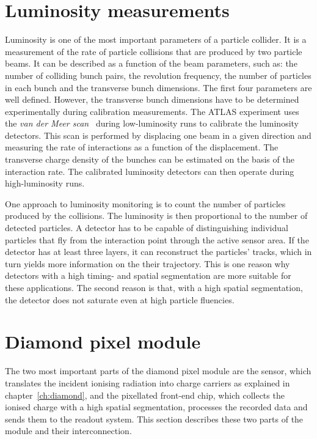 \section{Luminosity measurements}
\label{sec:lummeas}
 \label{sec:lumi}
Luminosity is one of the most important parameters of a particle collider. It is a measurement of the rate of particle collisions that are produced by two particle beams. It can be described as a function of the beam parameters, such as: the number of colliding bunch pairs, the revolution frequency, the number of particles in each bunch and the transverse bunch dimensions. The first four parameters are well defined. However, the transverse bunch dimensions have to be determined experimentally during calibration measurements. The ATLAS experiment uses the \emph{van der Meer scan}~\cite{} during low-luminosity runs to calibrate the luminosity detectors. This scan is performed by displacing one beam in a given direction and measuring the rate of interactions as a function of the displacement. The transverse charge density of the bunches can be estimated on the basis of the interaction rate. The calibrated luminosity detectors can then operate during high-luminosity runs.

One approach to luminosity monitoring is to count the number of particles produced by the collisions. The luminosity is then proportional to the number of detected particles. A detector has to be capable of distinguishing individual particles that fly from the interaction point through the active sensor area. If the detector has at least three layers, it can reconstruct the particles' tracks, which in turn yields more information on the their trajectory. This is one reason why detectors with a high timing- and spatial segmentation are more suitable for these applications. The second reason is that, with a high spatial segmentation, the detector does not saturate even at high particle fluencies.





\section{Diamond pixel module}
\label{sec:atlasdbm}
The two most important parts of the diamond pixel module are the sensor, which translates the incident ionising radiation into charge carriers as explained in chapter~\ref{ch:diamond}, and the pixellated front-end chip, which collects the ionised charge with a high spatial segmentation, processes the recorded data and sends them to the readout system. This section describes these two parts of the module and their interconnection.

